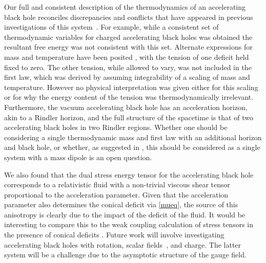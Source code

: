 \documentclass[
twoside,
openright,
frontopenright,
]{dmathesis}
\begin{document}
Our full and consistent description of the thermodynamics of an
accelerating black hole reconciles discrepancies and conflicts that have
appeared in previous investigations of this system~\cite{Appels:2016uha,
Appels:2017xoe,Astorino:2016ybm}.  For example, while a
consistent set of thermodynamic variables for charged accelerating black holes
was obtained \cite{Appels:2016uha,Appels:2017xoe,Gregory:2017ogk}
the resultant free energy was not consistent with this set.
Alternate expressions for mass and temperature have been posited
\cite{Astorino:2016ybm}, with the tension of one deficit  held fixed to zero.
The other tension, while allowed to vary, was not included in the
first law, which was derived by assuming integrability of a scaling
of mass and temperature.  However no physical interpretation was given
either for this scaling or for why the energy content of the tension was
thermodynamically irrelevant.
Furthermore, the vacuum accelerating black hole
has an acceleration horizon, akin to a Rindler horizon, and the full
structure of the spacetime is that of two accelerating black holes in
two Rindler regions. Whether one should be considering a single
thermodynamic mass and first law with an additional horizon and black hole,
or whether, as suggested in \cite{Dutta:2005iy}, this should be considered
as a single system with a mass dipole is an open question.

We also found that the dual stress energy tensor for the accelerating
black hole corresponds to a relativistic fluid with a non-trivial viscous
shear tensor proportional to the acceleration parameter. Given that
the acceleration parameter also determines the conical deficit via
\eqref{mueq}, the source of this anisotropy is clearly due to the impact
of the deficit of the fluid. It would be interesting to compare this to
the weak coupling calculation of stress tensors in the presence of
conical deficits \cite{Dowker:1977zj}.
Future work will involve investigating accelerating black holes with rotation,
scalar fields~\cite{Anabalon:2009qt, Anabalon:2012ta}, and charge. The latter
system will be a challenge due to the asymptotic structure of the gauge field.
\end{document}
